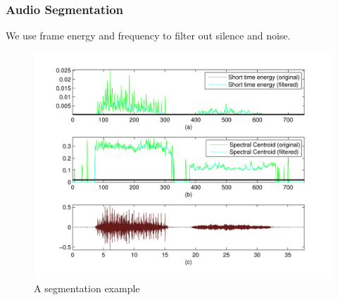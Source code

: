 \documentclass[xcolor=table,slidestop,compress,mathserif]{beamer}
\begin{document}
\begin{frame}
	\frametitle{Audio Segmentation}
	We use frame energy and frequency to filter out silence and noise. \\ 	
	\vspace{-0.25cm}
	\begin{figure}[htb]
	\centering
	\includegraphics[scale=0.5]{figure/segment.pdf}
	\caption{A segmentation example}
	\label{fig:segment}
	\end{figure}
\end{frame}
\end{document}
